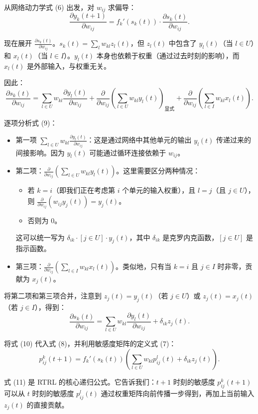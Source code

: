 \documentclass[journal,12pt,onecolumn]{IEEEtran}
\begin{document}
从网络动力学式 (6) 出发，对 $w_{ij}$ 求偏导：
\[
\frac{\partial y_k(t+1)}{\partial w_{ij}} = f_k'(s_k(t)) \cdot \frac{\partial s_k(t)}{\partial w_{ij}}. \tag{8}
\]

现在展开 $\frac{\partial s_k(t)}{\partial w_{ij}}$。$s_k(t) = \sum_l w_{kl} z_l(t)$，但 $z_l(t)$ 中包含了 $y_l(t)$（当 $l \in U$）和 $x_l(t)$（当 $l \in I$）。$y_l(t)$ 本身也依赖于权重（通过过去时刻的影响），而 $x_l(t)$ 是外部输入，与权重无关。

因此：
\[
\frac{\partial s_k(t)}{\partial w_{ij}} = \sum_{l \in U} w_{kl} \frac{\partial y_l(t)}{\partial w_{ij}} + \frac{\partial}{\partial w_{ij}} \left( \sum_{l \in U} w_{kl} y_l(t) \right)_{\text{显式}} + \frac{\partial}{\partial w_{ij}} \left( \sum_{l \in I} w_{kl} x_l(t) \right). \tag{9}
\]

逐项分析式 (9)：
\begin{itemize}
    \item 第一项 $\sum_{l \in U} w_{kl} \frac{\partial y_l(t)}{\partial w_{ij}}$：这是通过网络中其他单元的输出 $y_l(t)$ 传递过来的间接影响。因为 $y_l(t)$ 可能通过循环连接依赖于 $w_{ij}$。
    \item 第二项：$\frac{\partial}{\partial w_{ij}} (\sum_{l \in U} w_{kl} y_l(t))$。这里需要区分两种情况：
        \begin{itemize}
            \item 若 $k = i$（即我们正在考虑第 $i$ 个单元的输入权重），且 $l = j$（且 $j \in U$），则 $\frac{\partial}{\partial w_{ij}} (w_{ij} y_j(t)) = y_j(t)$。
            \item 否则为 0。
        \end{itemize}
        这可以统一写为 $\delta_{ik} \cdot [j \in U] \cdot y_j(t)$，其中 $\delta_{ik}$ 是克罗内克函数，$[j \in U]$ 是指示函数。
    \item 第三项：$\frac{\partial}{\partial w_{ij}} (\sum_{l \in I} w_{kl} x_l(t))$。类似地，只有当 $k=i$ 且 $j \in I$ 时非零，贡献为 $x_j(t)$。
\end{itemize}

将第二项和第三项合并，注意到 $z_j(t) = y_j(t)$（若 $j \in U$）或 $z_j(t) = x_j(t)$（若 $j \in I$），得到：
\[
\frac{\partial s_k(t)}{\partial w_{ij}} = \sum_{l \in U} w_{kl} \frac{\partial y_l(t)}{\partial w_{ij}} + \delta_{ik} z_j(t). \tag{10}
\]

将式 (10) 代入式 (8)，并利用敏感度矩阵的定义式 (7)：
\[
p_{ij}^{k}(t+1) = f_k'(s_k(t)) \left( \sum_{l \in U} w_{kl} p_{ij}^{l}(t) + \delta_{ik} z_j(t) \right). \tag{11}
\]

式 (11) 是 RTRL 的核心递归公式。它告诉我们：$t+1$ 时刻的敏感度 $p_{ij}^{k}(t+1)$ 可以从 $t$ 时刻的敏感度 $p_{ij}^{l}(t)$ 通过权重矩阵向前传播一步得到，再加上当前输入 $z_j(t)$ 的直接贡献。
\end{document}
